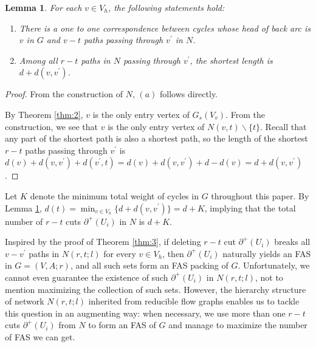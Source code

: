 \documentclass[11pt]{article}
\newtheorem{lemma}[theorem]{Lemma}
\begin{document}
\begin{lemma}
\label{lem:2}
For each $v\in V_h$, the following statements hold:
\begin{enumerate}[label=\emph{(}\alph*\emph{)}]
  \item There is a one to one correspondence between cycles whose head of back arc is $v$ in $G$ and $v-t$ paths passing through $v^\prime$ in $N$. 
  \item Among all $r-t$ paths in $N$ passing through $v^\prime$, the shortest length is $d+d(v,v^\prime)$.
\end{enumerate}
\end{lemma}
\begin{proof}
From the construction of $N$, $(a)$ follows directly.

By Theorem \ref{thm:2}, $v$ is the only entry vertex of $G_s(V_v)$. From the construction, we see that $v$ is the only entry vertex of $N(v,t)\backslash\{t\}$. Recall that any part of the shortest path is also a shortest path, so the length of the shortest $r-t$ paths passing through $v^\prime$ is $d(v)+d(v,v^\prime)+d(v^\prime,t)=d(v)+d(v,v^\prime)+d-d(v)=d+d(v,v^\prime)$.
\end{proof}

Let $K$ denote the minimum total weight of cycles in $G$ throughout this paper. By Lemma \ref{lem:2}, $d(t)=\min_{v\in V_h}\{d+d(v,v^\prime)\}=d+K$, implying that the total number of $r-t$ cuts $\partial^+(U_i)$ in $N$ is $d+K$.

Inspired by the proof of Theorem \ref{thm:3}, if deleting $r-t$ cut $\partial^+(U_i)$ breaks all $v-v^\prime$ paths in $N(r,t;l)$ for every $v\in V_h$, then $\partial^+(U_i)$ naturally yields an FAS in $G=(V,A;r)$, and all such sets form an FAS packing of $G$. Unfortunately, we cannot even guarantee the existence of such $\partial^+(U_i)$ in $N(r,t;l)$, not to mention maximizing the collection of such sets. However, the hierarchy structure of network $N(r,t;l)$ inherited from reducible flow graphs enables us to tackle this question in an augmenting way: when necessary, we use more than one $r-t$ cuts $\partial^+(U_i)$ from $N$ to form an FAS of $G$ and manage to maximize the number of FAS we can get.
\end{document}
